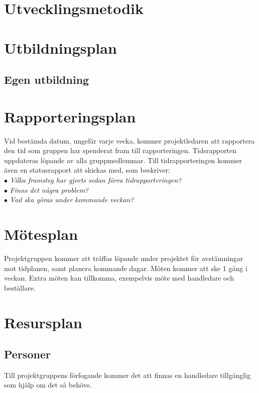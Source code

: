 \documentclass[11pt]{article}
\begin{document}
\begin{flushleft}
\begin{center}
\begin{longtable}{|p{.24\linewidth}|p{.08\linewidth}|p{.25\linewidth}|p{.19\linewidth}|p{.15\linewidth}|}
\end{longtable}
\end{center}
\pagebreak

\section{Utvecklingsmetodik}


\pagebreak

\section{Utbildningsplan}


\subsection{Egen utbildning}


\pagebreak

\section{Rapporteringsplan}
Vid bestämda datum, ungefär varje vecka, kommer projektledaren att rapportera den tid som gruppen har spenderat fram till rapporteringen. Tidsrapporten uppdateras löpande av alla gruppmedlemmar. Till tidrapporteringen kommer även en statusrapport att skickas med, som beskriver:\\
$\bullet$ \textit{Vilka framsteg har gjorts sedan förra tidrapporteringen?}\\
$\bullet$ \textit{Finns det några problem?}\\ 
$\bullet$ \textit{Vad ska göras under kommande veckan?}


\section{Mötesplan}
Projektgruppen kommer att träffas löpande under projektet för avstämningar mot tidplanen, samt planera kommande dagar. Möten kommer att ske 1 gång i veckan. Extra möten kan tillkomma, exempelvis möte med handledare och beställare.


\section{Resursplan}
\subsection{Personer}
Till projektgruppens förfogande kommer det att finnas en handledare tillgänglig som hjälp om det så behövs.


\end{flushleft}
\end{document}
